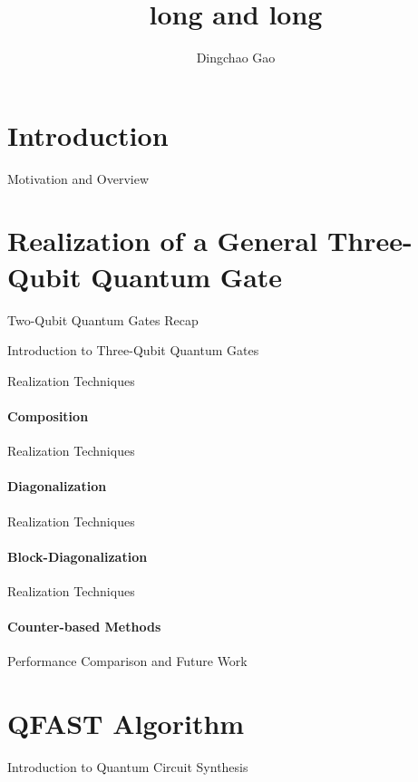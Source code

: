 \documentclass[aspectratio=1610]{beamer}
\title[]{long and long}
\author[Gcc]{Dingchao Gao}
\institute[ISCAS]{Institute of Software Chinese Academy of Sciences}
\begin{document}
\begin{frame}[plain]
  \titlepage
\end{frame}
\section{Introduction}

\begin{frame}{Motivation and Overview}
\end{frame}

\section{Realization of a General Three-Qubit Quantum Gate}

\begin{frame}{Two-Qubit Quantum Gates Recap}
\end{frame}

\begin{frame}{Introduction to Three-Qubit Quantum Gates}
\end{frame}

\begin{frame}{Realization Techniques}
\framesubtitle{Composition}
\end{frame}

\begin{frame}{Realization Techniques}
\framesubtitle{Diagonalization}
\end{frame}

\begin{frame}{Realization Techniques}
\framesubtitle{Block-Diagonalization}
\end{frame}

\begin{frame}{Realization Techniques}
\framesubtitle{Counter-based Methods}
\end{frame}

\begin{frame}{Performance Comparison and Future Work}
\end{frame}

\section{QFAST Algorithm}

\begin{frame}{Introduction to Quantum Circuit Synthesis}
\end{frame}
\end{document}
